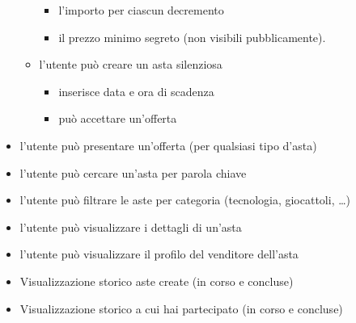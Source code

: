 \begin{itemize}
\begin{itemize}[label={\tiny$\blacksquare$}]
\begin{itemize}[label={\tiny$-$}]
			            \item l'importo per ciascun decremento
			            \item il prezzo minimo segreto (non visibili pubblicamente).
		            \end{itemize}
		      \item l'utente può creare un asta silenziosa
		            \begin{itemize}[label={\tiny$-$}]
			            \item inserisce data e ora di scadenza
			            \item può accettare un'offerta
		            \end{itemize}
	      \end{itemize}

	      \medskip
	\item l'utente può presentare un'offerta (per qualsiasi tipo d'asta) \medskip

	\item l'utente può cercare un'asta per parola chiave
	\item l'utente può filtrare le aste per categoria (tecnologia, giocattoli, …) \medskip

	\item l'utente può visualizzare i dettagli di un'asta
	\item l'utente può visualizzare il profilo del venditore dell'asta \medskip

	\item Visualizzazione storico aste create (in corso e concluse)
	\item Visualizzazione storico a cui hai partecipato (in corso e concluse)
\end{itemize}

\newpage
